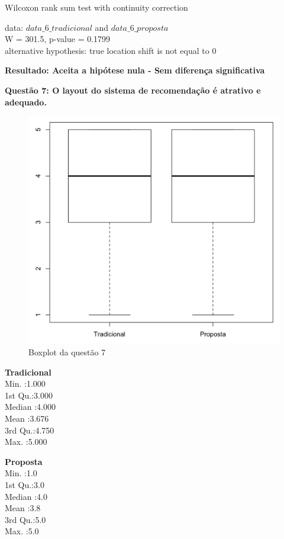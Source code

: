 Wilcoxon rank sum test with continuity correction

\noindent
data:  $data\_6\_tradicional$ and $data\_6\_proposta$\\
W = 301.5, p-value = 0.1799\\
alternative hypothesis: true location shift is not equal to 0

\textbf{Resultado: Aceita a hipótese nula - Sem diferença significativa}

\newpage
\textbf{Questão 7: O layout do sistema de recomendação é atrativo e adequado.}

\begin{figure}[htb]
  \caption{\label{fig:questao7-boxplot}Boxplot da questão 7}
  \begin{center}
      \includegraphics[scale=0.4]{./Figuras/questao7-boxplot.png}
  \end{center}
\end{figure}

\begin{multicols}{2}

\noindent\textbf{Tradicional}\\
Min.   :1.000\\
1st Qu.:3.000\\
Median :4.000\\
Mean   :3.676\\
3rd Qu.:4.750\\
Max.   :5.000\\
\columnbreak

\noindent\textbf{Proposta}\\
Min.   :1.0\\
1st Qu.:3.0\\
Median :4.0\\
Mean   :3.8\\
3rd Qu.:5.0\\
Max.   :5.0
\end{multicols}

